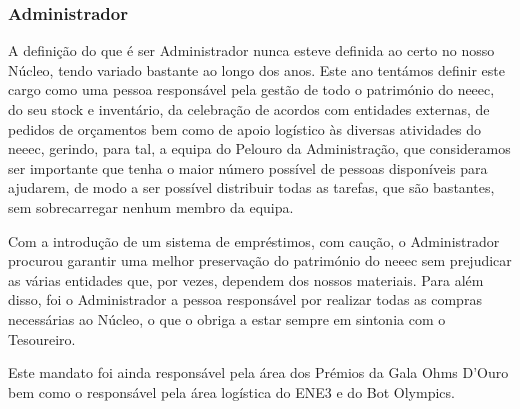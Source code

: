 
\subsubsection{Administrador}

A definição do que é ser Administrador nunca esteve definida ao certo no nosso Núcleo, tendo variado bastante ao longo dos anos. Este ano tentámos definir este cargo como uma pessoa responsável pela gestão de todo o património do \acrshort{neeec}, do seu stock e inventário, da celebração de acordos com entidades externas, de pedidos de orçamentos bem como de apoio logístico às diversas atividades do \acrshort{neeec}, gerindo, para tal, a equipa do Pelouro da Administração, que consideramos ser importante que tenha o maior número possível de pessoas disponíveis para ajudarem, de modo a ser possível distribuir todas as tarefas, que são bastantes, sem sobrecarregar nenhum membro da equipa.

Com a introdução de um sistema de empréstimos, com caução, o Administrador procurou garantir uma melhor preservação do património do \acrshort{neeec} sem prejudicar as várias entidades que, por vezes, dependem dos nossos materiais. Para além disso, foi o Administrador a pessoa responsável por realizar todas as compras necessárias ao Núcleo, o que o obriga a estar sempre em sintonia com o Tesoureiro.

Este mandato foi ainda responsável pela área dos Prémios da Gala Ohms D'Ouro bem como o responsável pela área logística do ENE3 e do Bot Olympics.